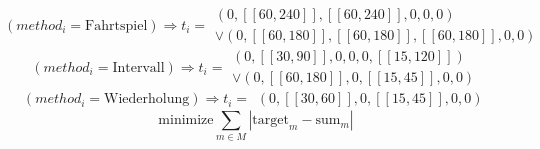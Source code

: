 \begin{equation*}
    (method_i = \text{Fahrtspiel})\Rightarrow t_i = \begin{array}{c}
            (0, [\![60, 240]\!], [\![60, 240]\!], 0, 0, 0) \\ 
        \vee (0, [\![60,180]\!], [\![60, 180]\!], [\![60, 180]\!], 0, 0)
    \end{array}
\end{equation*}
\begin{equation*}
    (method_i = \text{Intervall})\Rightarrow t_i = \begin{array}{c}
            (0, [\![30, 90]\!], 0, 0, 0, [\![15, 120]\!]) \\ 
        \vee (0, [\![60,180]\!], 0, [\![15, 45]\!], 0, 0)
    \end{array}
\end{equation*}
\begin{equation*}
    (method_i = \text{Wiederholung})\Rightarrow t_i = \begin{array}{c}
            (0, [\![30, 60]\!], 0, [\![15, 45]\!], 0, 0)
    \end{array}
\end{equation*}
\begin{equation*}
    \text{minimize} \sum_{m\in M} |\text{target}_m - \text{sum}_m|
\end{equation*} 
